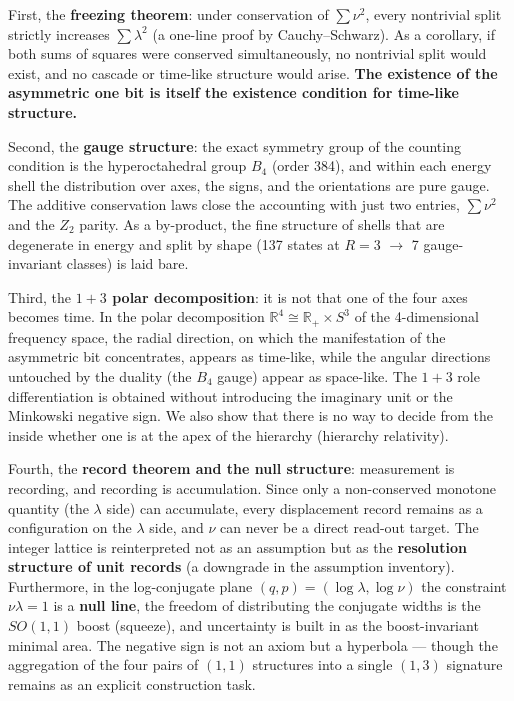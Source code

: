 \documentclass[
]{ltjsarticle}
\begin{document}
First, the \textbf{freezing theorem}: under conservation of
\(\sum\nu^2\), every nontrivial split strictly increases
\(\sum\lambda^2\) (a one-line proof by Cauchy--Schwarz). As a corollary,
if both sums of squares were conserved simultaneously, no nontrivial
split would exist, and no cascade or time-like structure would arise.
\textbf{The existence of the asymmetric one bit is itself the existence
condition for time-like structure.}

Second, the \textbf{gauge structure}: the exact symmetry group of the
counting condition is the hyperoctahedral group \(B_4\) (order 384), and
within each energy shell the distribution over axes, the signs, and the
orientations are pure gauge. The additive conservation laws close the
accounting with just two entries, \(\sum\nu^2\) and the \(Z_2\) parity.
As a by-product, the fine structure of shells that are degenerate in
energy and split by shape (137 states at \(R=3\) \(\to\) 7
gauge-invariant classes) is laid bare.

Third, the \textbf{\(1{+}3\) polar decomposition}: it is not that one of
the four axes becomes time. In the polar decomposition
\(\mathbb{R}^4\cong\mathbb{R}_+\times S^3\) of the 4-dimensional
frequency space, the radial direction, on which the manifestation of the
asymmetric bit concentrates, appears as time-like, while the angular
directions untouched by the duality (the \(B_4\) gauge) appear as
space-like. The \(1{+}3\) role differentiation is obtained without
introducing the imaginary unit or the Minkowski negative sign. We also
show that there is no way to decide from the inside whether one is at
the apex of the hierarchy (hierarchy relativity).

Fourth, the \textbf{record theorem and the null structure}: measurement
is recording, and recording is accumulation. Since only a non-conserved
monotone quantity (the \(\lambda\) side) can accumulate, every
displacement record remains as a configuration on the \(\lambda\) side,
and \(\nu\) can never be a direct read-out target. The integer lattice
is reinterpreted not as an assumption but as the \textbf{resolution
structure of unit records} (a downgrade in the assumption inventory).
Furthermore, in the log-conjugate plane \((q,p)=(\log\lambda,\log\nu)\)
the constraint \(\nu\lambda=1\) is a \textbf{null line}, the freedom of
distributing the conjugate widths is the \(SO(1,1)\) boost (squeeze),
and uncertainty is built in as the boost-invariant minimal area. The
negative sign is not an axiom but a hyperbola --- though the aggregation
of the four pairs of \((1,1)\) structures into a single \((1,3)\)
signature remains as an explicit construction task.
\end{document}
